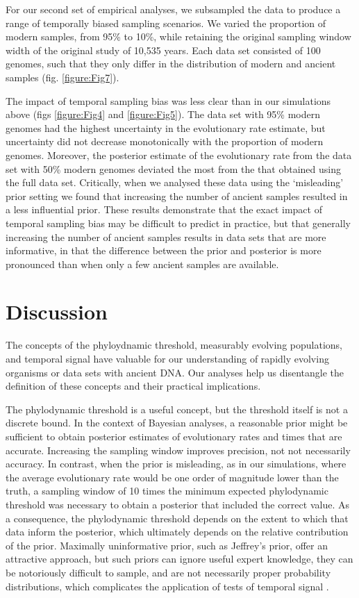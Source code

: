 \documentclass[11pt]{article}
\begin{document}
For our second set of empirical analyses, we subsampled the data to produce a range of temporally biased sampling scenarios. We varied the proportion of modern samples, from 95\% to 10\%, while retaining the original sampling window width of the original study of 10,535 years. Each data set consisted of 100 genomes, such that they only differ in the distribution of modern and ancient samples (fig. \ref{figure:Fig7}). 

The impact of temporal sampling bias was less clear than in our simulations above (figs \ref{figure:Fig4} and \ref{figure:Fig5}). The data set with 95\% modern genomes had the highest uncertainty in the evolutionary rate estimate, but uncertainty did not decrease monotonically with the proportion of modern genomes. Moreover, the posterior estimate of the evolutionary rate from the data set with 50\% modern genomes deviated the most from the that obtained using the full data set. Critically, when we analysed these data using the `misleading' prior setting we found that increasing the number of ancient samples resulted in a less influential prior. These results demonstrate that the exact impact of temporal sampling bias may be difficult to predict in practice, but that generally increasing the number of ancient samples results in data sets that are more informative, in that the difference between the prior and posterior is more pronounced than when only a few ancient samples are available.

\section{Discussion}
The concepts of the phyloydnamic threshold, measurably evolving populations, and temporal signal have valuable for our understanding of rapidly evolving organisms or data sets with ancient DNA. Our analyses help us disentangle the definition of these concepts and their practical implications. 

The phylodynamic threshold is a useful concept, but the threshold itself is not a discrete bound. In the context of Bayesian analyses, a reasonable prior might be sufficient to obtain posterior estimates of evolutionary rates and times that are accurate. Increasing the sampling window improves precision, not not necessarily accuracy. In contrast, when the prior is misleading, as in our simulations, where the average evolutionary rate would be one order of magnitude lower than the truth, a sampling window of 10 times the minimum expected phylodynamic threshold was necessary to obtain a posterior that included the correct value. As a consequence, the phylodynamic threshold depends on the extent to which that data inform the posterior, which ultimately depends on the relative contribution of the prior. Maximally uninformative prior, such as Jeffrey's prior, offer an attractive approach, but such priors can ignore useful expert knowledge, they can be notoriously difficult to sample, and are not necessarily proper probability distributions, which complicates the application of tests of temporal signal \citep{duchene2020bayesian}. 
\end{document}
